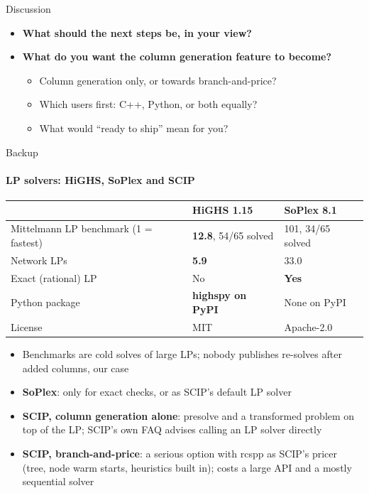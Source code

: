 \documentclass[aspectratio=169]{beamer}
\begin{document}
\begin{frame}{Discussion}

  \begin{itemize}
    \item \textbf{What should the next steps be, in your view?}
    \item \textbf{What do you want the column generation feature to become?}
      \begin{itemize}
        \item Column generation only, or towards branch-and-price?
        \item Which users first: C++, Python, or both equally?
        \item What would ``ready to ship'' mean for you?
      \end{itemize}
  \end{itemize}
\end{frame}

\begin{frame}{Backup}
  \framesubtitle{LP solvers: HiGHS, SoPlex and SCIP}

  \small
  \centering
  \begin{tabular}{lll}
    \toprule
    & \textbf{HiGHS 1.15} & \textbf{SoPlex 8.1} \\
    \midrule
    Mittelmann LP benchmark (1 = fastest) & \textbf{12.8}, 54/65 solved & 101, 34/65 solved \\
    Network LPs & \textbf{5.9} & 33.0 \\
    Exact (rational) LP & No & \textbf{Yes} \\
    Python package & \textbf{highspy on PyPI} & None on PyPI \\
    License & MIT & Apache-2.0 \\
    \bottomrule
  \end{tabular}

  \raggedright
  \vspace{0.6em}
  \begin{itemize}
    \item Benchmarks are cold solves of large LPs; nobody publishes re-solves after added columns, our case
    \item \textbf{SoPlex}: only for exact checks, or as SCIP's default LP solver
    \item \textbf{SCIP, column generation alone}: presolve and a transformed problem on top of the LP;
      SCIP's own FAQ advises calling an LP solver directly
    \item \textbf{SCIP, branch-and-price}: a serious option with rcspp as SCIP's pricer (tree, node warm starts,
      heuristics built in); costs a large API and a mostly sequential solver
  \end{itemize}
\end{frame}
\end{document}
